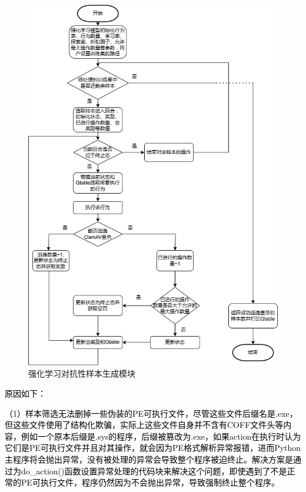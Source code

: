 \begin{figure}
  \centering
  \includegraphics[scale=0.70]{images/reinforcement_learning_adversarial_sample_generation_module.png}
  \caption{强化学习对抗性样本生成模块}\label{fig:reinforcement_learning_adversarial_sample_generation_module}
\end{figure}

\textcolor{black}{原因如下：}

\textcolor{black}{（1）样本筛选无法删掉一些伪装的PE可执行文件，尽管这些文件后缀名是.exe，但这些文件使用了结构化欺骗，实际上这些文件自身并不含有COFF文件头等内容，例如一个原本后缀是.sys的程序，后缀被篡改为.exe，如果action在执行时认为它们是PE可执行文件并且对其操作，就会因为PE格式解析异常报错，进而Python主程序将会抛出异常，没有被处理的异常会导致整个程序被迫终止。解决方案是通过为do\_action()函数设置异常处理的代码块来解决这个问题，即使遇到了不是正常的PE可执行文件，程序仍然因为不会抛出异常，导致强制终止整个程序。}

